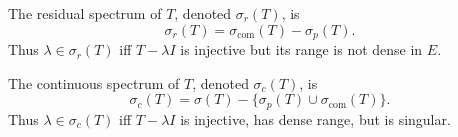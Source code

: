 The residual spectrum of $T$, denoted $\sigma_r(T)$, is
$$\sigma_r(T) = \sigma_{\text{com}}(T) - \sigma_p(T).$$
Thus $\lambda \in \sigma_r(T)$ iff $T - \lambda I$ is injective but its range is not dense in $E$.

The continuous spectrum of $T$, denoted $\sigma_c(T)$, is
$$\sigma_c(T) = \sigma(T) - \{\sigma_p(T) \cup \sigma_{\text{com}}(T)\}.$$
Thus $\lambda \in \sigma_c(T)$ iff $T - \lambda I$ is injective, has dense range, but is singular.
